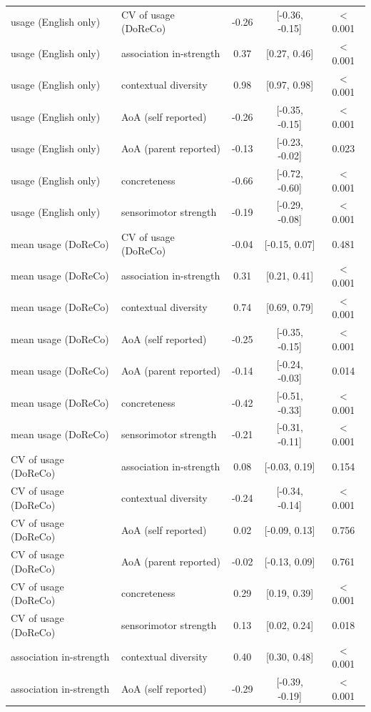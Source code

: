 \begin{tabular}{llccc}
  usage (English only) & CV of usage (DoReCo) & -0.26 & [-0.36, -0.15] & < 0.001 \\ 
  usage (English only) & association in-strength & 0.37 & [0.27, 0.46] & < 0.001 \\ 
  usage (English only) & contextual diversity & 0.98 & [0.97, 0.98] & < 0.001 \\ 
  usage (English only) & AoA (self reported) & -0.26 & [-0.35, -0.15] & < 0.001 \\ 
  usage (English only) & AoA (parent reported) & -0.13 & [-0.23, -0.02] & 0.023 \\ 
  usage (English only) & concreteness & -0.66 & [-0.72, -0.60] & < 0.001 \\ 
  usage (English only) & sensorimotor strength & -0.19 & [-0.29, -0.08] & < 0.001 \\ 
  mean usage (DoReCo) & CV of usage (DoReCo) & -0.04 & [-0.15, 0.07] & 0.481 \\ 
  mean usage (DoReCo) & association in-strength & 0.31 & [0.21, 0.41] & < 0.001 \\ 
  mean usage (DoReCo) & contextual diversity & 0.74 & [0.69, 0.79] & < 0.001 \\ 
  mean usage (DoReCo) & AoA (self reported) & -0.25 & [-0.35, -0.15] & < 0.001 \\ 
  mean usage (DoReCo) & AoA (parent reported) & -0.14 & [-0.24, -0.03] & 0.014 \\ 
  mean usage (DoReCo) & concreteness & -0.42 & [-0.51, -0.33] & < 0.001 \\ 
  mean usage (DoReCo) & sensorimotor strength & -0.21 & [-0.31, -0.11] & < 0.001 \\ 
  CV of usage (DoReCo) & association in-strength & 0.08 & [-0.03, 0.19] & 0.154 \\ 
  CV of usage (DoReCo) & contextual diversity & -0.24 & [-0.34, -0.14] & < 0.001 \\ 
  CV of usage (DoReCo) & AoA (self reported) & 0.02 & [-0.09, 0.13] & 0.756 \\ 
  CV of usage (DoReCo) & AoA (parent reported) & -0.02 & [-0.13, 0.09] & 0.761 \\ 
  CV of usage (DoReCo) & concreteness & 0.29 & [0.19, 0.39] & < 0.001 \\ 
  CV of usage (DoReCo) & sensorimotor strength & 0.13 & [0.02, 0.24] & 0.018 \\ 
  association in-strength & contextual diversity & 0.40 & [0.30, 0.48] & < 0.001 \\ 
  association in-strength & AoA (self reported) & -0.29 & [-0.39, -0.19] & < 0.001 \\ 

\end{tabular}
